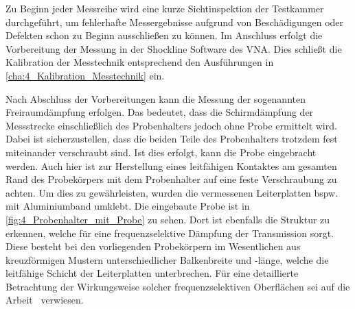 Zu Beginn jeder Messreihe wird eine kurze Sichtinspektion der Testkammer durchgeführt, um fehlerhafte Messergebnisse aufgrund von Beschädigungen oder Defekten schon zu Beginn ausschließen zu können. Im Anschluss erfolgt die Vorbereitung der Messung in der Shockline Software des VNA. Dies schließt die Kalibration der Messtechnik entsprechend den Ausführungen in \Abschnitt\ref{cha:4_Kalibration_Messtechnik} ein.
\par
\vspace{\linespace}
Nach Abschluss der Vorbereitungen kann die Messung der sogenannten Freiraumdämpfung erfolgen. Das bedeutet, dass die Schirmdämpfung der Messstrecke einschließlich des Probenhalters jedoch ohne Probe ermittelt wird. Dabei ist sicherzustellen, dass die beiden Teile des Probenhalters trotzdem fest miteinander verschraubt sind. Ist dies erfolgt, kann die Probe eingebracht werden. Auch hier ist zur Herstellung eines leitfähigen Kontaktes am gesamten Rand des Probekörpers mit dem Probenhalter auf eine feste Verschraubung zu achten. Um dies zu gewährleisten, wurden die vermessenen Leiterplatten bspw. mit Aluminiumband umklebt. Die eingebaute Probe ist in \Abb\ref{fig:4_Probenhalter_mit_Probe} zu sehen. Dort ist ebenfalls die Struktur zu erkennen, welche für eine frequenzselektive Dämpfung der Transmission sorgt. Diese besteht bei den vorliegenden Probekörpern im Wesentlichen aus kreuzförmigen Mustern unterschiedlicher Balkenbreite und -länge, welche die leitfähige Schicht der Leiterplatten unterbrechen. Für eine detaillierte Betrachtung der Wirkungsweise solcher frequenzselektiven Oberflächen sei auf die Arbeit~\cite{FSS_Toedter_Diplomarbeit} verwiesen.
\par
\vspace{\linespace}


